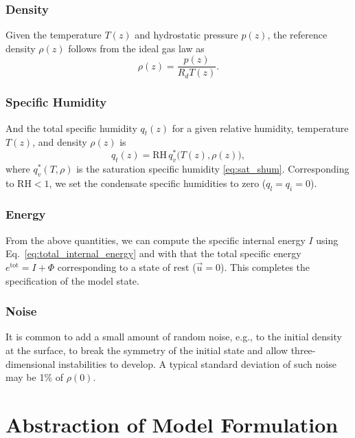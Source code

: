 \documentclass{report}
\begin{document}
{\subsubsection{Density}
 
Given the temperature $T(z)$ and hydrostatic pressure $p(z)$, the reference density $\rho(z)$ follows from the ideal gas law as
\begin{equation}\label{eq:hydro_density}
    \rho(z) = \frac{p(z)}{R_d T(z)}.
\end{equation}

\subsubsection{Specific Humidity}

And the total specific humidity $q_t(z)$ for a given relative humidity, temperature $T(z)$, and density $\rho(z)$ is
\begin{equation}
    q_t(z) = \mathrm{RH} \, q_v^*\bigl( T(z), \rho(z) \bigr),
\end{equation}
where $q_v^*(T, \rho)$ is the saturation specific humidity \eqref{eq:sat_shum}. Corresponding to $\mathrm{RH} < 1$, we set the condensate specific humidities to zero ($q_l = q_i = 0$).

\subsubsection{Energy}

From the above quantities, we can compute the specific internal energy $I$ using Eq.~\eqref{eq:total_internal_energy} and with that the total specific energy $e^{\mathrm{tot}} = I + \Phi$ corresponding to a state of rest ($\vec{u}=0$). This completes the specification of the model state.

\subsubsection{Noise}

It is common to add a small amount of random noise, e.g., to the initial density at the surface, to break the symmetry of the initial state and allow three-dimensional instabilities to develop. A typical standard deviation of such noise may be 1\% of $\rho(0)$.

\section{Abstraction of Model Formulation}\label{s:abstract_model_formulation}

}
\end{document}
